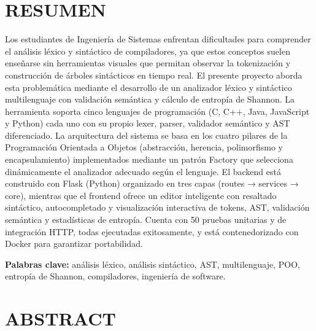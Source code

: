 \documentclass[12pt,a4paper]{article}
\begin{document}
\section*{RESUMEN}

Los estudiantes de Ingeniería de Sistemas enfrentan dificultades para comprender el análisis léxico y sintáctico de compiladores, ya que estos conceptos suelen enseñarse sin herramientas visuales que permitan observar la tokenización y construcción de árboles sintácticos en tiempo real. El presente proyecto aborda esta problemática mediante el desarrollo de un analizador léxico y sintáctico multilenguaje con validación semántica y cálculo de entropía de Shannon. La herramienta soporta cinco lenguajes de programación (C, C++, Java, JavaScript y Python) cada uno con su propio lexer, parser, validador semántico y AST diferenciado. La arquitectura del sistema se basa en los cuatro pilares de la Programación Orientada a Objetos (abstracción, herencia, polimorfismo y encapsulamiento) implementados mediante un patrón Factory que selecciona dinámicamente el analizador adecuado según el lenguaje. El backend está construido con Flask (Python) organizado en tres capas (routes → services → core), mientras que el frontend ofrece un editor inteligente con resaltado sintáctico, autocompletado y visualización interactiva de tokens, AST, validación semántica y estadísticas de entropía. Cuenta con 50 pruebas unitarias y de integración HTTP, todas ejecutadas exitosamente, y está contenedorizado con Docker para garantizar portabilidad.

\textbf{Palabras clave:} análisis léxico, análisis sintáctico, AST, multilenguaje, POO, entropía de Shannon, compiladores, ingeniería de software.

\section*{ABSTRACT}
\end{document}
